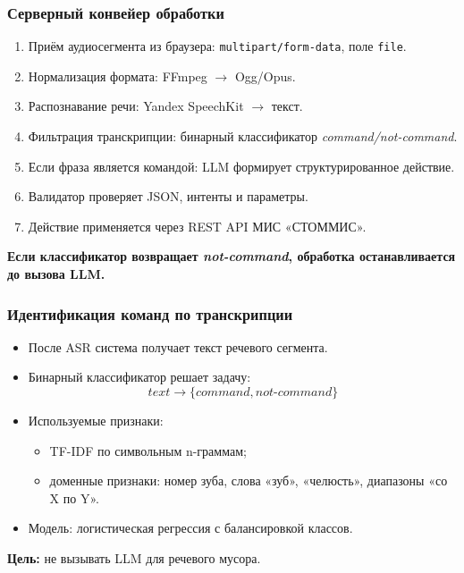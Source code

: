 \documentclass{beamer}
\begin{document}
\begin{frame}
  \frametitle{Серверный конвейер обработки}
  \begin{enumerate}
    \item Приём аудиосегмента из браузера: \texttt{multipart/form-data}, поле \texttt{file}.
    \item Нормализация формата: FFmpeg $\rightarrow$ Ogg/Opus.
    \item Распознавание речи: Yandex SpeechKit $\rightarrow$ текст.
    \item Фильтрация транскрипции: бинарный классификатор \textit{command/not-command}.
    \item Если фраза является командой: LLM формирует структурированное действие.
    \item Валидатор проверяет JSON, интенты и параметры.
    \item Действие применяется через REST API МИС «СТОММИС».
  \end{enumerate}

  \vspace{6pt}
  \textbf{Если классификатор возвращает \textit{not-command}, обработка останавливается до вызова LLM.}

\end{frame}

\begin{frame}
  \frametitle{Идентификация команд по транскрипции}

  \begin{itemize}
    \item После ASR система получает текст речевого сегмента.
    \item Бинарный классификатор решает задачу:
    \[
      text \rightarrow \{\textit{command}, \textit{not-command}\}
    \]
    \item Используемые признаки:
    \begin{itemize}
      \item TF-IDF по символьным n-граммам;
      \item доменные признаки: номер зуба, слова «зуб», «челюсть», диапазоны «со X по Y».
    \end{itemize}
    \item Модель: логистическая регрессия с балансировкой классов.
  \end{itemize}

  \vspace{6pt}
  \textbf{Цель:} не вызывать LLM для речевого мусора.

\end{frame}
\end{document}
